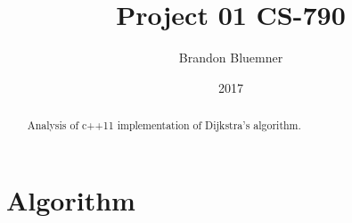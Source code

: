 \documentclass[12pt]{article}
\begin{document}
\title{Project 01 CS-790}
\author{Brandon Bluemner}
\date{2017}
\maketitle
\begin{abstract}
Analysis of c++11 implementation of Dijkstra's algorithm. 

\end{abstract}

\section[Algorithm]{Algorithm}
\end{document}
